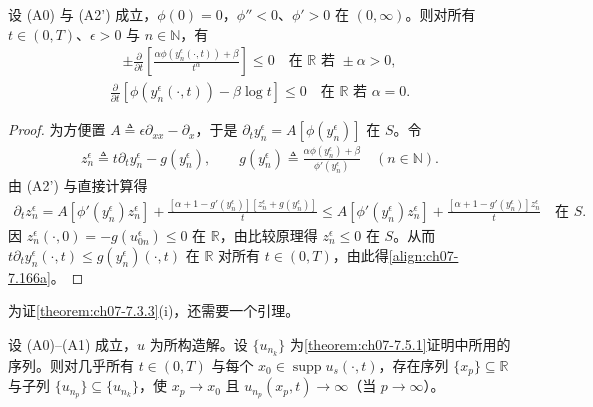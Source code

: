 \documentclass[../../main.tex]{subfiles}%
\begin{document}
\begin{lemma}\label{lemma:ch07-7.6.2}
设 (A0) 与 (A2') 成立，$\phi(0)=0$，$\phi''<0$、$\phi'>0$ 在 $(0,\infty)$。则对所有 $t\in(0,T)$、$\epsilon>0$ 与 $n\in\mathbb{N}$，有
\begin{align}
\pm\frac{\partial}{\partial t}\left[\frac{\alpha\phi(y_n^\epsilon(\cdot,t))+\beta}{t^\alpha}\right]\leqslant0\quad\text{在 }\mathbb{R}\text{ 若 }\pm\alpha>0, \label{align:ch07-7.166a}
\end{align}
\begin{align}
\frac{\partial}{\partial t}[\phi(y_n^\epsilon(\cdot,t))-\beta\log t]\leqslant0\quad\text{在 }\mathbb{R}\text{ 若 }\alpha=0. \label{align:ch07-7.166b}
\end{align}
\end{lemma}

\begin{proof}
为方便置 $A\triangleq \epsilon\partial_{xx}-\partial_x$，于是 $\partial_t y_n^\epsilon=A[\phi(y_n^\epsilon)]$ 在 $S$。令
\begin{align*}
z_n^\epsilon\triangleq t\partial_t y_n^\epsilon-g(y_n^\epsilon),\qquad
g(y_n^\epsilon)\triangleq \frac{\alpha\phi(y_n^\epsilon)+\beta}{\phi'(y_n^\epsilon)}\quad(n\in\mathbb{N}).
\end{align*}
由 (A2') 与直接计算得
\begin{align*}
\partial_t z_n^\epsilon=A[\phi'(y_n^\epsilon)z_n^\epsilon]
+\frac{[\alpha+1-g'(y_n^\epsilon)][z_n^\epsilon+g(y_n^\epsilon)]}{t}
\leqslant A[\phi'(y_n^\epsilon)z_n^\epsilon]+\frac{[\alpha+1-g'(y_n^\epsilon)]z_n^\epsilon}{t}
\quad\text{在 }S.
\end{align*}
因 $z_n^\epsilon(\cdot,0)=-g(u_{0n}^\epsilon)\leqslant0$ 在 $\mathbb{R}$，由比较原理得 $z_n^\epsilon\leqslant0$ 在 $S$。从而 $t\partial_t y_n^\epsilon(\cdot,t)\leqslant g(y_n^\epsilon)(\cdot,t)$ 在 $\mathbb{R}$ 对所有 $t\in(0,T)$，由此得\eqref{align:ch07-7.166a}。
\end{proof}

为证\cref{theorem:ch07-7.3.3}(i)，还需要一个引理。

\begin{lemma}\label{lemma:ch07-7.6.3}
设 (A0)--(A1) 成立，$u$ 为所构造解。设 $\{u_{n_k}\}$ 为\cref{theorem:ch07-7.5.1}证明中所用的序列。则对几乎所有 $t\in(0,T)$ 与每个 $x_0\in\operatorname{supp}u_s(\cdot,t)$，存在序列 $\{x_p\}\subseteq\mathbb{R}$ 与子列 $\{u_{n_p}\}\subseteq\{u_{n_k}\}$，使 $x_p\to x_0$ 且 $u_{n_p}(x_p,t)\to\infty$（当 $p\to\infty$）。
\end{lemma}
\end{document}
